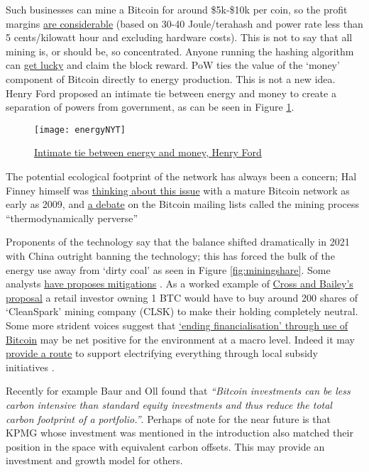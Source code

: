 Such businesses can mine a Bitcoin for around \$5k-\$10k per coin, so the profit margins \href{https://www.nicehash.com/profitability-calculator}{are considerable} (based on 30-40 Joule/terahash and power rate less than 5 cents/kilowatt hour and excluding hardware costs). This is not to say that all mining is, or should be, so concentrated. Anyone running the hashing algorithm can \href{https://twitter.com/ckpooldev/status/1485585814419812356}{get lucky} and claim the block reward. PoW ties the value of the `money' component of Bitcoin directly to energy production. This is not a new idea. Henry Ford proposed an intimate tie between energy and money to create a separation of powers from government, as can be seen in Figure \ref{fig:energyNYT}.\
\begin{figure}
  \centering
    \texttt{[image: energyNYT]}
  \caption{\href{https://www.nytimes.com/1921/12/06/archives/mr-fords-energy-dollar.html}{Intimate tie between energy and money, Henry Ford}}
  \label{fig:energyNYT}
\end{figure}
The potential ecological footprint of the network has always been a concern; Hal Finney himself was \href{https://twitter.com/halfin/status/1153096538}{thinking about this issue} with a mature Bitcoin network as early as 2009, and \href{https://satoshi.nakamotoinstitute.org/posts/bitcointalk/threads/167/#35}{a debate} on the Bitcoin mailing lists called the mining process ``thermodynamically perverse'' \par
Proponents of the technology say that the balance shifted dramatically in 2021 with China outright banning the technology; this has forced the bulk of the energy use away from `dirty coal' as seen in Figure \ref{fig:miningshare}. Some analysts \href{https://docs.google.com/document/d/1N2N-5jY00cmteoY_puWI9oosM1foa4EQqsO1FFfIFR4/edit}{have proposes mitigations} \cite{cross2021greening}. As a worked example of \href{https://docs.google.com/spreadsheets/d/15e_a-D3x4fv3tglEzFmQ6TLQx0fZe6-iKO9Fc9SyISQ/edit#gid=0}{Cross and Bailey's proposal} a retail investor owning 1 BTC would have to buy around 200 shares of `CleanSpark' mining company (CLSK) to make their holding completely neutral. Some more strident voices suggest that \href{https://medium.com/@magusperivallon/a-financial-hail-mary-for-the-climate-an-argument-for-bitcoin-adoption-9c58e707d0}{`ending financialisation' through use of Bitcoin} may be net positive for the environment at a macro level. Indeed it may \href{https://www.newsweek.com/bitcoin-mining-americas-most-misunderstood-industry-opinion-1669892}{provide a route} to support electrifying everything through local subsidy initiatives \cite{griffith2021electrify}.\par Recently for example Baur and Oll found that \textit{``Bitcoin investments can be less carbon intensive than standard equity investments and thus reduce the total carbon footprint of a portfolio.''}\cite{baur2021bitcoin}. Perhaps of note for the near future is that KPMG whose investment was mentioned in the introduction also matched their position in the space with equivalent  carbon offsets. This may provide an investment and growth model for others.
